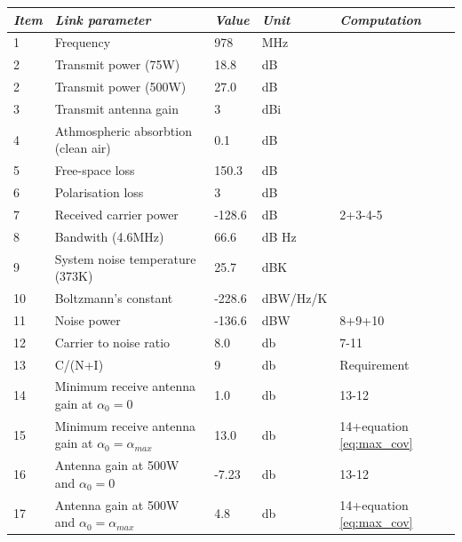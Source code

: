 \begin{center}
 \label{tab:978}
  \begin{tabular}{ l  l  l  l  l}
    \hline
   \textit{Item} & \textit{Link parameter} & \textit{Value} & \textit{Unit} & \textit{Computation} \\ \hline
    1 & Frequency	& 978 & MHz & \\ \hline
    2 & Transmit power (75W) & 18.8 & dB & \\ \hline
    2 & Transmit power (500W) & 27.0 & dB & \\ \hline
    3 & Transmit antenna gain & 3 & dBi & \\ \hline
    4 & Athmospheric absorbtion (clean air) & 0.1 & dB & \\ \hline
    5 & Free-space loss & 150.3 & dB & \\ \hline
    6 & Polarisation loss & 3 & dB & \\ \hline
    7 & Received carrier power & -128.6 & dB & 2+3-4-5\\ \hline
    8 & Bandwith (4.6MHz) & 66.6 & dB Hz & \\ \hline 
    9 & System noise temperature (373K) & 25.7 & dBK& \\ \hline 
    10 & Boltzmann's constant & -228.6 & dBW/Hz/K& \\ \hline 
    11 & Noise power & -136.6 & dBW& 8+9+10\\ \hline 
    12 & Carrier to noise ratio & 8.0 & db & 7-11\\ \hline 
    13 & C/(N+I) & 9 & db & Requirement\\ \hline
    14 & Minimum receive antenna gain at $\alpha_0 = 0 $ & 1.0 & db & 13-12\\ \hline
    15 & Minimum receive antenna gain at $\alpha_0 = \alpha_{max} $ & 13.0 & db & 14+equation \ref{eq:max_cov} \\ \hline
    16 & Antenna gain at 500W and  $\alpha_0 = 0 $  & -7.23 & db & 13-12\\ \hline
    17 & Antenna gain at 500W and $\alpha_0 = \alpha_{max} $ & 4.8 & db & 14+equation \ref{eq:max_cov} \\ \hline 
  \end{tabular}
\end{center}



